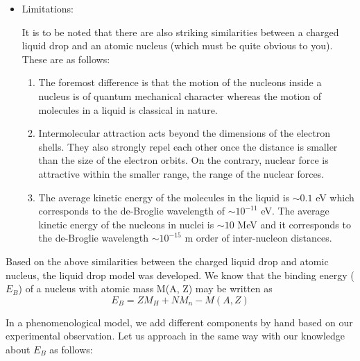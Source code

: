 \documentclass[ebook,12pt,oneside,openany]{memoir}
\begin{document}
\begin{itemize}
            \item Limitations:
                \par It is to be noted that there are also striking similarities between a charged liquid drop and an atomic nucleus (which must be quite obvious to you). These are as follows:
            
                \begin{enumerate}
                    \item The foremost difference is that the motion of the nucleons inside a nucleus is of quantum mechanical character whereas the motion of molecules in a liquid is classical in nature.
                    \item Intermolecular attraction acts beyond the dimensions of the electron shells. They also strongly repel each other once the distance is smaller than the size of the electron orbits. On the contrary, nuclear force is attractive within the smaller range, the range of the nuclear forces.
                    \item The average kinetic energy of the molecules in the liquid is $\sim0.1$ eV which corresponds to the de-Broglie wavelength of $\sim10^{-11}$ eV. The average kinetic energy of the nucleons in nuclei is $\sim10$ MeV and it corresponds to the de-Broglie wavelength $\sim10^{-15}$ m order of inter-nucleon distances.
                \end{enumerate}
        \end{itemize} 
        
    Based on the above similarities between the charged liquid drop and atomic nucleus, the liquid drop model was developed. We know that the binding energy ($E_B$) of a nucleus with atomic mass M(A, Z) may be written as
        \begin{equation}
        E_B = ZM_H + NM_n - M(A, Z)
        \end{equation} 
    \par In a phenomenological model, we add different components by hand based on our experimental observation. Let us approach in the same way with our knowledge about $E_B$ as follows:
    
\end{document}

